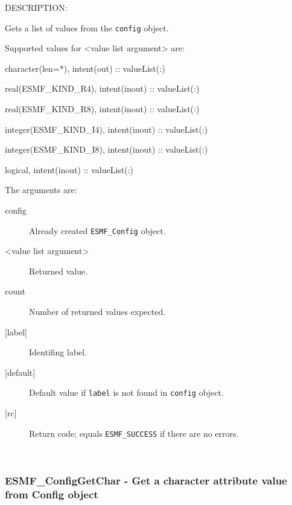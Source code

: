 {\sf DESCRIPTION:\\ }


        Gets a list of values from the {\tt config} object.  
  
        Supported values for <value list argument> are:
        \begin{description}
        \item character(len=*), intent(out)            :: valueList(:)
        \item real(ESMF\_KIND\_R4), intent(inout)      :: valueList(:)
        \item real(ESMF\_KIND\_R8), intent(inout)      :: valueList(:)
        \item integer(ESMF\_KIND\_I4), intent(inout)   :: valueList(:)
        \item integer(ESMF\_KIND\_I8), intent(inout)   :: valueList(:)
        \item logical, intent(inout)                   :: valueList(:)
        \end{description}
  
     The arguments are:
     \begin{description}
     \item [config]
       Already created {\tt ESMF\_Config} object.
     \item [<value list argument>]
       Returned value.
     \item [count]
       Number of returned values expected.  
     \item [{[label]}]
       Identifing label. 
     \item [{[default]}]
       Default value if {\tt label} is not found in {\tt config} object. 
     \item [{[rc]}]
       Return code; equals {\tt ESMF\_SUCCESS} if there are no errors.
     \end{description} 
 
\mbox{}\hrulefill\ 
 

  \subsubsection [ESMF\_ConfigGetChar] {ESMF\_ConfigGetChar - Get a character attribute value from Config object}


